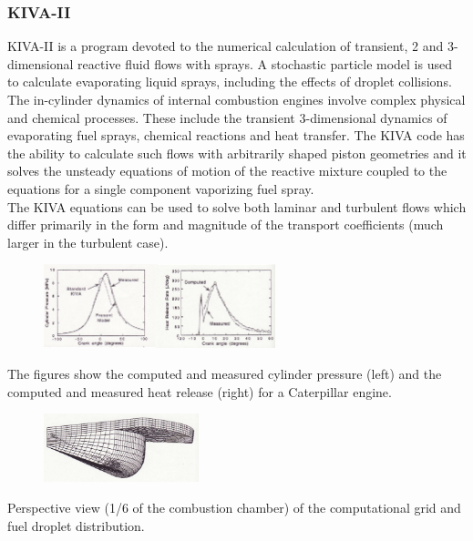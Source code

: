 \documentclass[12pt]{article}
\begin{document}
\subsubsection{KIVA-II}

KIVA-II is a program devoted to the numerical calculation of transient, 2 and 3-dimensional reactive fluid flows with sprays. A stochastic particle model is used to calculate evaporating liquid sprays, including the effects of droplet collisions.\\
The in-cylinder dynamics of internal combustion engines involve complex physical and chemical processes. These include the transient 3-dimensional dynamics of evaporating fuel sprays, chemical reactions and heat transfer. The KIVA code has the ability to calculate such flows with arbitrarily shaped piston geometries and it solves the unsteady equations of motion of the reactive mixture coupled to the equations for a single component vaporizing fuel spray.\\
The KIVA equations can be used to solve both laminar and turbulent flows which differ primarily in the form and magnitude of the transport coefficients (much larger in the turbulent case).

\begin{figure}[!ht]
\centering
\includegraphics[width=0.6\textwidth]{figures/kiva.png}
\end{figure}

The figures show the computed and measured cylinder pressure (left) and the computed and measured heat release (right) for a Caterpillar engine.

\begin{figure}[!ht]
\centering
\includegraphics[width=0.4\textwidth]{figures/grid.png}
\end{figure}

Perspective view (1/6 of the combustion chamber) of the computational grid and fuel droplet distribution.
\end{document}
